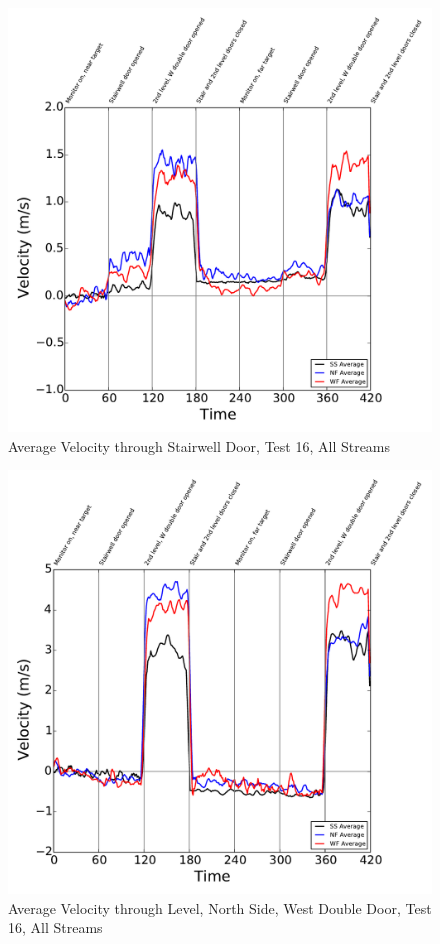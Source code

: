 \documentclass[12pt,oneside]{book}
\begin{document}
\begin{figure}[!ht]
\includegraphics[width=6in]{../../../Figures/Hose_Test_Figures/Test_16_West_063014_custom_BDP_A10_Avg}
\caption{Average Velocity through Stairwell Door, Test 16, All Streams}
\label{fig:Test_16_BDP_A10_Avg_All}
\end{figure}

\begin{figure}[!ht]
\includegraphics[width=6in]{../../../Figures/Hose_Test_Figures/Test_16_West_063014_custom_BDP_A13_Avg}
\caption{Average Velocity through  Level, North Side, West Double Door, Test 16, All Streams}
\label{fig:Test_16_BDP_A13_Avg_All}
\end{figure}
\end{document}
